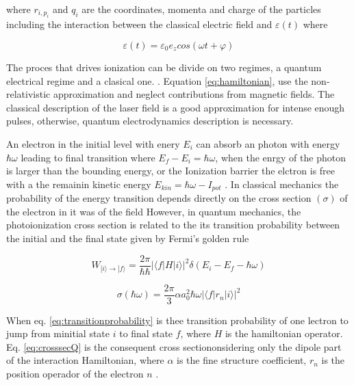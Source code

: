where $ r_{i,  p_{i}} $ and $ q_{i} $ are the coordinates, momenta and charge of the particles including the interaction between the classical electric field and $ \varepsilon(t) $ where \cite{mikaberidze_atomic_1981}

\begin{equation}
\varepsilon(t) = \varepsilon_{0} e_{z}cos(\omega t + \varphi)
\end{equation}

The proces that drives ionization can be divide on two regimes, a quantum electrical regime and a clasical one. \cite{karnakov_strong_2009}. Equation \ref{eq:hamiltonian}, use the non-relativistic approximation and neglect contributions from magnetic fields. The classical description of the laser field is a good approximation
for intense enough pulses, otherwise, quantum electrodynamics description is necessary.

An electron in the initial level with enery $E_{i}$ can absorb an photon with energy $\hbar \omega$ leading to final transition where $E_{f}-E_{i}=\hbar \omega$, when the enrgy of the photon is larger than the bounding energy, or the Ionization barrier the elctron is free with a the remainin kinetic energy $E_{kin} = \hbar \omega - I_{pot}$ \cite{becker_vuv_1996}.
In classical mechanics the probability of the energy transition depends directly on the cross section $(\sigma)$ of the electron in it was of the field However,  in  quantum  mechanics,  the photoionization cross section is related to the its transition probability between the initial and the final state given by Fermi’s golden rule

 \begin{equation} 
 \label{eq:transitionprobability}
W_{|i\rangle \rightarrow |f\rangle} = \frac{2\pi}{\hbar\hbar} |\langle f|H|i\rangle|^{2} \delta(E_{i} - E_{f}-\hbar\omega)
 \end{equation}
 
 \begin{equation}
 \label{eq:crosssecQ}
 \sigma(\hbar \omega) = \frac{2\pi}{3} \alpha a_{0}^{2} \hbar \omega |\langle f|r_{n}|i\rangle|^{2}
 \end{equation}
 
When eq. \ref{eq:transitionprobability} is thee transition probability of one lectron to jump from minitial state $i$ to final state $f$, where $H$ is the hamiltonian operator. Eq. \ref{eq:crosssecQ} is the consequent cross sectiononsidering only the dipole part of the interaction Hamiltonian, where $\alpha$ is the fine structure coefficient, $r_{n}$ is the position operador of the electron $n$ \cite{fermi_quantum_1932}.

